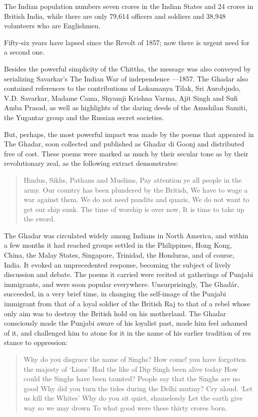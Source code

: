 The Indian population numbers seven crores in the Indian States and 24 crores in British India, while there are only 79,614 officers and soldiers and 38,948 volunteers who are Englishmen.

Fifty-six years have lapsed since the Revolt of 1857; now there is urgent need for a second one.

Besides the powerful simplicity of the Chittha, the message was also conveyed by serializing Savarkar’s The Indian War of independence —1857. The Ghadar also contained references to the contributions of Lokamanya Tilak, Sri Aurobjndo, V.D. Savarkar, Madame Cama, Shyamji Krishna Varma, Ajit Singh and Sufi Amba Prasad, as well as highlights of the daring deeds of the Anushilan Samiti, the Yugantar group and the Russian secret societies.

But, perhaps, the most powerful impact was made by the poems that appeared in The Ghadar, soon collected and published as Ghadar di Goonj and distributed free of cost. These poems were marked as much by their secular tone as by their revolutionary zeal, as the following extract demonstrates:

\begin{verse}
	Hindus, Sikhs, Pathans and Muslims,
	Pay attention ye all people in the army.
	Our country has been plundered by the British,
	We have to wage a war against them.
	We do not need pandits and quazis,
	We do not want to get our ship sunk.
	The time of worship is over now,
	It is time to take up the sword.
\end{verse}

The Ghadar was circulated widely among Indians in North America, and within a few months it had reached groups settled in the Philippines, Hong Kong, China, the Malay States, Singapore, Trinidad, the Honduras, and of course, India. It evoked an unprecedented response, becoming the subject of lively discussion and debate. The poems it carried were recited at gatherings of Punjabi immigrants, and were soon popular everywhere. Unsurprisingly, The Ghadár, succeeded, in a very brief time, in changing the self-image of the Punjabi immigrant from that of a loyal soldier of the British Raj to that of a rebel whose only aim was to destroy the British hold on his motherland. The Ghadar consciously made the Punjabi aware of his loyalist past, made him feel ashamed of it, and challenged him to atone for it in the name of his earlier tradition of res stance to oppression:

\begin{verse}
	Why do you disgrace the name of Singhs?
	How come! you have forgotten the majesty of ‘Lions’
	Had the like of Dip Singh been alive today
	How could the Singhs have been taunted?
	People say that the Singhs are no good
	Why did you turn the tides during the Delhi mutiny?
	Cry aloud. ‘Let us kill the Whites’
	Why do you sit quiet, shamelessly
	Let the earth give way so we may drown
	To what good were these thirty crores born.
\end{verse}

